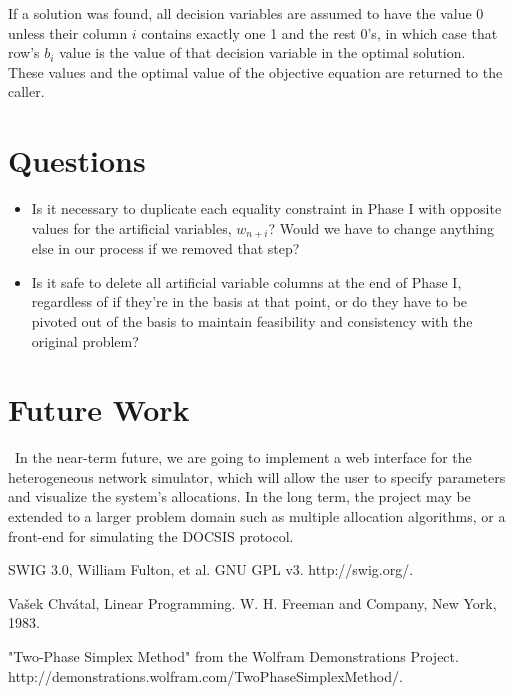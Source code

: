 \documentclass[11pt]{article}
\begin{document}
If a solution was found, all decision variables are assumed to have the value 0 unless their column $i$ contains exactly one 1 and the rest 0's, in which case that row's $b_i$ value is the value of that decision variable in the optimal solution.~\cite{chvatal83} These values and the optimal value of the objective equation are returned to the caller.

\section{Questions}

\begin{itemize}
\item Is it necessary to duplicate each equality constraint in Phase I with opposite values for the artificial variables, $w_{n+i}$? Would we have to change anything else in our process if we removed that step?
\item Is it safe to delete all artificial variable columns at the end of Phase I, regardless of if they're in the basis at that point, or do they have to be pivoted out of the basis to maintain feasibility and consistency with the original problem?
\end{itemize}

\section{Future Work}

~\indent In the near-term future, we are going to implement a web interface for 
the heterogeneous network simulator, which will allow the user to specify 
parameters and visualize the system's allocations. In the long term, 
the project may be extended to a larger problem domain such as multiple 
allocation algorithms, or a front-end for simulating the DOCSIS protocol.

\begin{thebibliography}{9}
  SWIG 3.0,
  William Fulton, et al.  
  GNU GPL v3.
  http://swig.org/.
    
  Vašek Chvátal,
  Linear Programming.
  W. H. Freeman and Company, New York,
  1983.
  
  "Two-Phase Simplex Method" from the Wolfram Demonstrations Project.\\
  http://demonstrations.wolfram.com/TwoPhaseSimplexMethod/.

\end{thebibliography}  
       
\end{document}
